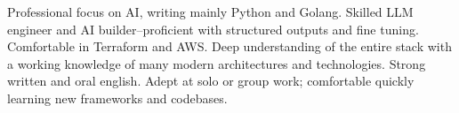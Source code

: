 

\begin{cvparagraph}

Professional focus on AI, writing mainly Python and Golang. Skilled LLM engineer and AI builder--proficient with structured outputs and fine tuning. Comfortable in Terraform and AWS\@. Deep understanding of the entire stack with a working knowledge of many modern architectures and technologies. Strong written and oral english. Adept at solo or group work; comfortable quickly learning new frameworks and codebases.
\end{cvparagraph}
